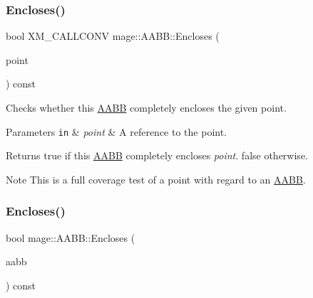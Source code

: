 \subsubsection{\texorpdfstring{Encloses()}{Encloses()}\hspace{0.1cm}{\footnotesize\ttfamily [2/4]}}
{\footnotesize\ttfamily bool X\+M\+\_\+\+C\+A\+L\+L\+C\+O\+NV mage\+::\+A\+A\+B\+B\+::\+Encloses (\begin{DoxyParamCaption}\item[{F\+X\+M\+V\+E\+C\+T\+OR}]{point }\end{DoxyParamCaption}) const\hspace{0.3cm}{\ttfamily [noexcept]}}

Checks whether this \mbox{\hyperlink{classmage_1_1_a_a_b_b}{A\+A\+BB}} completely encloses the given point.


\begin{DoxyParams}[1]{Parameters}
\mbox{\tt in}  & {\em point} & A reference to the point. \\
\hline
\end{DoxyParams}
\begin{DoxyReturn}{Returns}
{\ttfamily true} if this \mbox{\hyperlink{classmage_1_1_a_a_b_b}{A\+A\+BB}} completely encloses {\itshape point}. {\ttfamily false} otherwise. 
\end{DoxyReturn}
\begin{DoxyNote}{Note}
This is a full coverage test of a point with regard to an \mbox{\hyperlink{classmage_1_1_a_a_b_b}{A\+A\+BB}}. 
\end{DoxyNote}
\mbox{\label{classmage_1_1_a_a_b_b_a06f017756a593461127613e4d77d0944}} 
\subsubsection{\texorpdfstring{Encloses()}{Encloses()}\hspace{0.1cm}{\footnotesize\ttfamily [3/4]}}
{\footnotesize\ttfamily bool mage\+::\+A\+A\+B\+B\+::\+Encloses (\begin{DoxyParamCaption}\item[{const \mbox{\hyperlink{classmage_1_1_a_a_b_b}{A\+A\+BB}} \&}]{aabb }\end{DoxyParamCaption}) const\hspace{0.3cm}{\ttfamily [noexcept]}}

